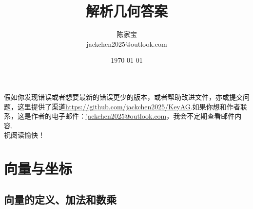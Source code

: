 \documentclass[UTF8]{ctexart}
\title{解析几何答案}
\author{陈家宝\\jackchen2025@outlook.com}
\date{\today}
\begin{document}
\maketitle

假如你发现错误或者想要最新的错误更少的版本，或者帮助改进文件，亦或提交问题，这里提供了渠道\url{https://github.com/jackchen2025/KeyAG}.如果你想和作者联系，这是作者的电子邮件：\url{jackchen2025@outlook.com}，我会不定期查看邮件内容. \\
祝阅读愉快！
\tableofcontents

\section{向量与坐标}
\subsection{向量的定义、加法和数乘}
\end{document}
